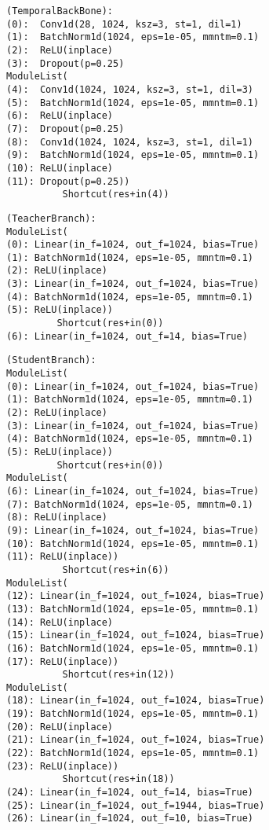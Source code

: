 \documentclass[10pt,twocolumn,letterpaper]{article}
\begin{document}
\begin{lstlisting}
(TemporalBackBone): 
(0):  Conv1d(28, 1024, ksz=3, st=1, dil=1)
(1):  BatchNorm1d(1024, eps=1e-05, mmntm=0.1)
(2):  ReLU(inplace)
(3):  Dropout(p=0.25)
ModuleList(
(4):  Conv1d(1024, 1024, ksz=3, st=1, dil=3)
(5):  BatchNorm1d(1024, eps=1e-05, mmntm=0.1)
(6):  ReLU(inplace)
(7):  Dropout(p=0.25)
(8):  Conv1d(1024, 1024, ksz=3, st=1, dil=1)
(9):  BatchNorm1d(1024, eps=1e-05, mmntm=0.1)
(10): ReLU(inplace)
(11): Dropout(p=0.25))
		  Shortcut(res+in(4))
\end{lstlisting}

\begin{lstlisting}
(TeacherBranch): 
ModuleList(
(0): Linear(in_f=1024, out_f=1024, bias=True)
(1): BatchNorm1d(1024, eps=1e-05, mmntm=0.1)
(2): ReLU(inplace)
(3): Linear(in_f=1024, out_f=1024, bias=True)
(4): BatchNorm1d(1024, eps=1e-05, mmntm=0.1)
(5): ReLU(inplace))
		 Shortcut(res+in(0))
(6): Linear(in_f=1024, out_f=14, bias=True)
\end{lstlisting}

\begin{lstlisting}
(StudentBranch): 
ModuleList(
(0): Linear(in_f=1024, out_f=1024, bias=True)
(1): BatchNorm1d(1024, eps=1e-05, mmntm=0.1)
(2): ReLU(inplace)
(3): Linear(in_f=1024, out_f=1024, bias=True)
(4): BatchNorm1d(1024, eps=1e-05, mmntm=0.1)
(5): ReLU(inplace))
		 Shortcut(res+in(0))
ModuleList(
(6): Linear(in_f=1024, out_f=1024, bias=True)
(7): BatchNorm1d(1024, eps=1e-05, mmntm=0.1)
(8): ReLU(inplace)
(9): Linear(in_f=1024, out_f=1024, bias=True)
(10): BatchNorm1d(1024, eps=1e-05, mmntm=0.1)
(11): ReLU(inplace))
		  Shortcut(res+in(6))
ModuleList(
(12): Linear(in_f=1024, out_f=1024, bias=True)
(13): BatchNorm1d(1024, eps=1e-05, mmntm=0.1)
(14): ReLU(inplace)
(15): Linear(in_f=1024, out_f=1024, bias=True)
(16): BatchNorm1d(1024, eps=1e-05, mmntm=0.1)
(17): ReLU(inplace))
		  Shortcut(res+in(12))
ModuleList(
(18): Linear(in_f=1024, out_f=1024, bias=True)
(19): BatchNorm1d(1024, eps=1e-05, mmntm=0.1)
(20): ReLU(inplace)
(21): Linear(in_f=1024, out_f=1024, bias=True)
(22): BatchNorm1d(1024, eps=1e-05, mmntm=0.1)
(23): ReLU(inplace))
		  Shortcut(res+in(18))
(24): Linear(in_f=1024, out_f=14, bias=True) 
(25): Linear(in_f=1024, out_f=1944, bias=True)
(26): Linear(in_f=1024, out_f=10, bias=True)
\end{lstlisting}
\end{document}
